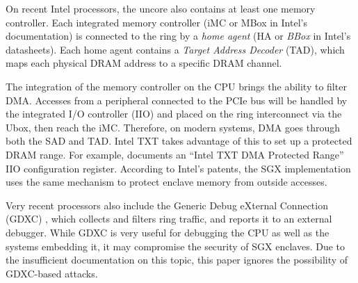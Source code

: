 On recent Intel processors, the uncore also contains at least one memory
controller. Each integrated memory controller (iMC or MBox in Intel's
documentation) is connected to the ring by a \textit{home agent} (HA or
\textit{BBox} in Intel's datasheets). Each home agent contains a
\textit{Target Address Decoder} (TAD), which maps each physical DRAM address to
a specific DRAM channel.

The integration of the memory controller on the CPU brings the ability to
filter DMA. Accesses from a peripheral connected to the PCIe bus will be
handled by the integrated I/O controller (IIO) and placed on the ring
interconnect via the Ubox, then reach the iMC. Therefore, on modern systems,
DMA goes through both the SAD and TAD. Intel TXT takes advantage of this to set
up a protected DRAM range. For example, \cite{intel2015datasheet} documents an
``Intel TXT DMA Protected Range'' IIO configuration register. According to
Intel's patents, the SGX implementation uses the same mechanism to protect
enclave memory from outside accesses.

Very recent processors also include the Generic Debug eXternal Connection
(GDXC) \cite{yuffe2011sandybridge, intel2011gdxc}, which collects and filters
ring traffic, and reports it to an external debugger. While GDXC is very useful
for debugging the CPU as well as the systems embedding it, it may compromise
the security of SGX enclaves. Due to the insufficient documentation on this
topic, this paper ignores the possibility of GDXC-based attacks.
